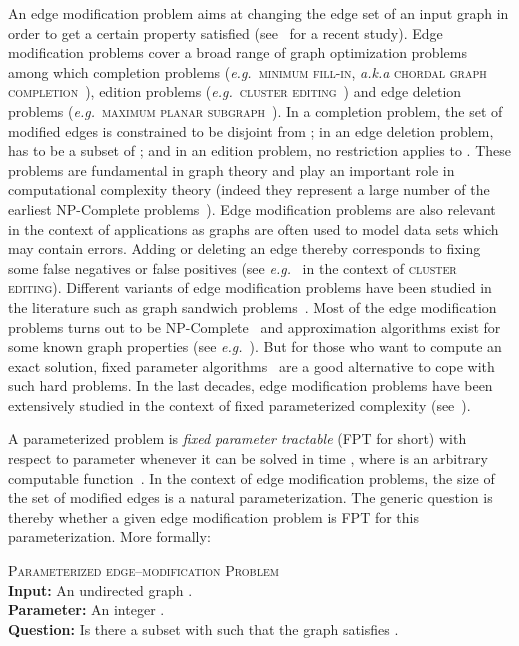 \documentclass[11pt]{article}
\newcommand{\eg}{\textit{e.g.}}
\begin{document}
An edge modification problem aims at changing the edge set of an input graph  in order to get a certain property  satisfied (see~\cite{NSS01} for a recent study). Edge modification problems cover a broad range of graph optimization problems among which completion problems (\eg ~\textsc{minimum fill-in}, \emph{a.k.a}  \textsc{chordal graph completion}~\cite{Ros72,TY84}), edition problems (\eg ~\textsc{cluster editing}~\cite{SST04}) and edge deletion problems (\eg ~\textsc{maximum planar subgraph}~\cite{GJ79}).  In a completion problem, the set  of modified edges is constrained to be disjoint from ; in an edge deletion problem,  has to be a subset of ; and in an edition problem, no restriction applies to . These problems are fundamental in graph theory and play an important role in computational complexity theory (indeed they represent a large number of the earliest NP-Complete problems~\cite{GJ79}). Edge modification problems are also relevant in the context of applications as graphs are often used to model data sets which may contain errors. Adding or deleting an edge thereby corresponds to fixing some false negatives or false positives (see \emph{e.g.}~\cite{SST04} in the context of \textsc{cluster editing}). Different variants of edge modification problems have been studied in the literature such as graph sandwich problems~\cite{GKS95}.
Most of the edge modification problems turns out to be NP-Complete~\cite{NSS01} and approximation algorithms exist for some known graph properties (see \eg~\cite{KS07,ZW08}). But for those who want to compute an exact solution, fixed parameter algorithms~\cite{DF99,FG06,Nie06} are a good alternative to cope with such hard problems. In the last decades, edge modification problems have been extensively studied in the context of fixed parameterized complexity (see~\cite{Cai96,FLR07,HPTV07}). 

A parameterized problem  is \emph{fixed parameter tractable} (FPT for short) with respect to parameter  whenever it can be solved in time , where  is an arbitrary computable function~\cite{DF99,Nie06}. 
In the context of edge modification problems, the size  of the set  of modified edges is a natural parameterization. The generic question is thereby whether a given edge modification problem is FPT for this parameterization. More formally:

\medskip
\noindent
\textsc{Parameterized  edge--modification Problem}\\
\textbf{Input:} An undirected graph .\\
\textbf{Parameter:} An integer .\\
\textbf{Question:} Is there a subset  with
 such that the graph  satisfies .
\end{document}
